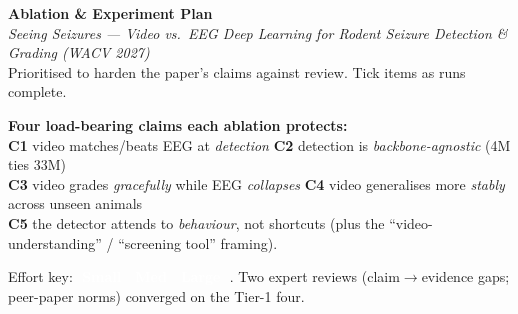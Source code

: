 \documentclass[11pt]{article}
\newcommand{\eff}[2]{\,\colorbox{#1}{\textcolor{white}{\scriptsize\bfseries\,#2\,}}}
\newcommand{\effS}{\eff{effS}{Small}}
\newcommand{\effM}{\eff{effM}{Med}}
\newcommand{\effL}{\eff{effL}{Large}}
\begin{document}
\begin{center}
  {\LARGE\bfseries Ablation \& Experiment Plan}\\[2pt]
  {\large\itshape Seeing Seizures --- Video vs.\ EEG Deep Learning for Rodent Seizure Detection \& Grading (WACV 2027)}\\[4pt]
  {\small Prioritised to harden the paper's claims against review. Tick items as runs complete.}
\end{center}

\vspace{4pt}
\colorbox{boxbg}{\parbox{\dimexpr\linewidth-2\fboxsep}{%
\textbf{Four load-bearing claims each ablation protects:}\\
\textbf{C1} video matches/beats EEG at \emph{detection}\quad
\textbf{C2} detection is \emph{backbone-agnostic} (4M ties 33M)\\
\textbf{C3} video grades \emph{gracefully} while EEG \emph{collapses}\quad
\textbf{C4} video generalises more \emph{stably} across unseen animals\\
\textbf{C5} the detector attends to \emph{behaviour}, not shortcuts \quad(plus the ``video-understanding'' / ``screening tool'' framing).}}

\vspace{4pt}
{\small Effort key: \effS\ \effM\ \effL\ . Two expert reviews (claim$\to$evidence gaps; peer-paper norms) converged on the Tier-1 four.}
\end{document}
